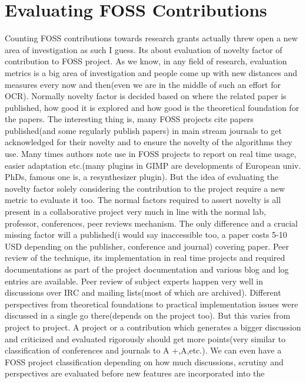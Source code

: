 \section*{Evaluating FOSS Contributions}
\vskip 2pt

Counting FOSS contributions towards research grants actually threw open
a new area of investigation as such I guess. Its about evaluation of novelty
factor of contribution to FOSS project. As we know, in any field of research,
evaluation metrics is a big area of investigation and people come up with new
distances and measures every now and then(even we are in the middle of
such an effort for OCR). Normally novelty factor is decided based on where
the related paper is published, how good it is explored and how good is the
theoretical foundation for the papers.  The interesting thing is, many FOSS
projects cite papers published(and some regularly publish papers) in main
stream journals to get acknowledged for their novelty and to ensure the novelty of
the algorithms they use. Many times authors note use in FOSS projects to
report on real time usage, easier adaptation etc.(many plugins in GIMP are
developments of European univ. PhDs, famous one is, a resynthesizer plugin).
But the idea of evaluating the novelty factor solely considering the contribution
to the project require a new metric to evaluate it too. The normal factors
required to assert novelty is all present in a collaborative project very
much in line with the normal lab, professor, conferences, peer reviews mechanism.
The only difference and a crucial missing factor will a published(i would
say inaccessible too, a paper costs 5-10 USD depending on the publisher,
conference and journal) covering paper.  Peer review of the technique,
its implementation in real time projects and required documentations as
part of the project documentation and various blog and log entries are
available. Peer review of subject experts happen very well in discussions
over IRC and mailing lists(most of which are archived). Different perspectives
from theoretical foundations to practical implementation issues were discussed
in a single go there(depends on the project too). But this varies from project
to project. A project or a contribution which generates a bigger discussion
and criticized and evaluated rigorously should get more points(very similar
to classification of conferences and journals to A +,A,etc.).  We can even
have a FOSS project classification depending on how much discussions, scrutiny
and perspectives are evaluated before new features are incorporated into the
